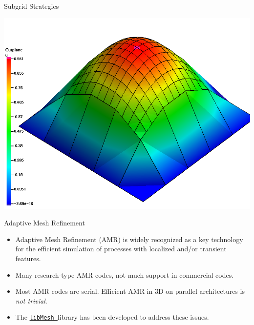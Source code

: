 \documentclass[landscape,pdftex,headrule,footrule]{foils}
\newcommand{\libMesh}{\href{http://libmesh.sourceforge.net}{\texttt{libMesh\ }}}
\begin{document}
\begin{foil}{Subgrid Strategies}
{{      \centerline{\includegraphics[width=.8\textwidth]{figures/02}}
    }
  }
\end{foil}



\begin{foil}{Adaptive Mesh Refinement}
  \begin{itemize}
    \item Adaptive Mesh Refinement (AMR) is widely recognized as a key
          technology for the efficient simulation of processes with localized and/or transient features.
    \item Many research-type AMR codes, not much support in commercial codes.
    \item Most AMR codes are serial.  Efficient AMR in 3D on parallel architectures is \emph{not trivial}.
    \item The \libMesh library has been developed to address these issues.
  \end{itemize}
\end{foil}
\end{document}
